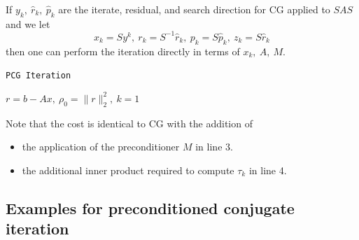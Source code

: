 \begin{algo}
  If $y_k,\ \hat{r}_k,\ \hat{p}_k$ are the iterate, residual, and
  search direction for CG applied to $SAS$ and we let
  $$x_k=Sy^k,\ r_k=S^{-1}\hat{r}_k,\ p_k=S\hat{p}_k,\ z_k=S\hat{r}_k$$
  then one can perform the iteration directly in terms of $x_k,\ A,\
  M$.
  
  \IncMargin{1em}
  \LinesNumbered
  \begin{algorithm}[H]

    \caption{\texttt{PCG Iteration}}
    \Postcond{$\|r_k\|_2\leq\epsilon\|b\|_2$ or $k=k_{\text{max}}$} 
    \BlankLine
    $r=b-Ax,\ \rho_0=\|r\|_2^2,\ k=1$\;
  \end{algorithm}
  \DecMargin{1em}
\end{algo}

\begin{rmk}
  Note that the cost is identical to CG with the addition of
  \begin{itemize}
  \item the application of the preconditioner $M$ in line 3.
  \item the additional inner product required to compute $\tau_k$ in
    line 4.
  \end{itemize}
\end{rmk}

\subsection{Examples for preconditioned conjugate iteration}
\label{sec:2.7}

